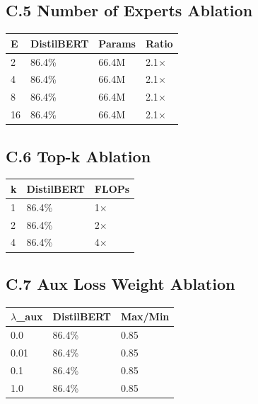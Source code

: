 \subsection{C.5 Number of Experts Ablation}

\begin{table}[H]
\centering
\small
\begin{tabular}{llll}
\toprule
\textbf{E} & \textbf{DistilBERT} & \textbf{Params} & \textbf{Ratio} \\
\midrule
2 & 86.4\% & 66.4M & 2.1$\times$ \\
4 & 86.4\% & 66.4M & 2.1$\times$ \\
8 & 86.4\% & 66.4M & 2.1$\times$ \\
16 & 86.4\% & 66.4M & 2.1$\times$ \\
\bottomrule
\end{tabular}
\end{table}

\subsection{C.6 Top-k Ablation}

\begin{table}[H]
\centering
\small
\begin{tabular}{lll}
\toprule
\textbf{k} & \textbf{DistilBERT} & \textbf{FLOPs} \\
\midrule
1 & 86.4\% & 1$\times$ \\
2 & 86.4\% & 2$\times$ \\
4 & 86.4\% & 4$\times$ \\
\bottomrule
\end{tabular}
\end{table}

\subsection{C.7 Aux Loss Weight Ablation}

\begin{table}[H]
\centering
\small
\begin{tabular}{lll}
\toprule
\textbf{$\lambda$\_aux} & \textbf{DistilBERT} & \textbf{Max/Min} \\
\midrule
0.0 & 86.4\% & 0.85 \\
0.01 & 86.4\% & 0.85 \\
0.1 & 86.4\% & 0.85 \\
1.0 & 86.4\% & 0.85 \\
\bottomrule
\end{tabular}
\end{table}

